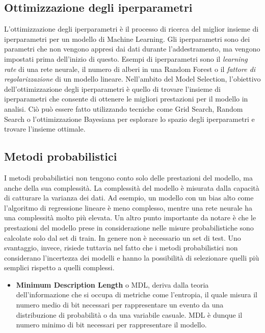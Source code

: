 \subsection{Ottimizzazione degli iperparametri}
L'ottimizzazione degli iperparametri è il processo di ricerca del miglior insieme di iperparametri per un modello di Machine Learning. Gli iperparametri sono dei parametri che non vengono appresi dai dati durante l'addestramento, ma vengono impostati prima dell'inizio di questo. Esempi di iperparametri sono il \textit{learning rate} di una rete neurale, il numero di alberi in una Random Forest o il \textit{fattore di regolarizzazione} di un modello lineare. Nell'ambito del Model Selection, l'obiettivo dell'ottimizzazione degli iperparametri è quello di trovare l'insieme di iperparametri che consente di ottenere le migliori prestazioni per il modello in analisi. Ciò può essere fatto utilizzando tecniche come Grid Search, Random Search o l'ottimizzazione Bayesiana per esplorare lo spazio degli iperparametri e trovare l'insieme ottimale.


\subsection{Metodi probabilistici}
I metodi probabilistici non tengono conto solo delle prestazioni del modello, ma anche della sua complessità. La complessità del modello è misurata dalla capacità di catturare la varianza dei dati. 
Ad esempio, un modello con un bias alto come l'algoritmo di regressione lineare è meno complesso, mentre una rete neurale ha una complessità molto più elevata.
Un altro punto importante da notare è che le prestazioni del modello prese in considerazione nelle misure probabilistiche sono calcolate solo dal set di train. In genere non è necessario un set di test.
Uno svantaggio, invece, risiede tuttavia nel fatto che i metodi probabilistici non considerano l'incertezza dei modelli e hanno la possibilità di selezionare  quelli più semplici rispetto a quelli complessi.
\begin{itemize}
	\item \textbf{Minimum Description Length} o MDL, deriva dalla teoria dell'informazione che si occupa di metriche come l'entropia, il quale misura il numero medio di bit necessari per rappresentare un evento da una distribuzione di probabilità o da una variabile casuale. 
	      MDL è dunque il numero minimo di bit necessari per rappresentare il modello.
\end{itemize}

